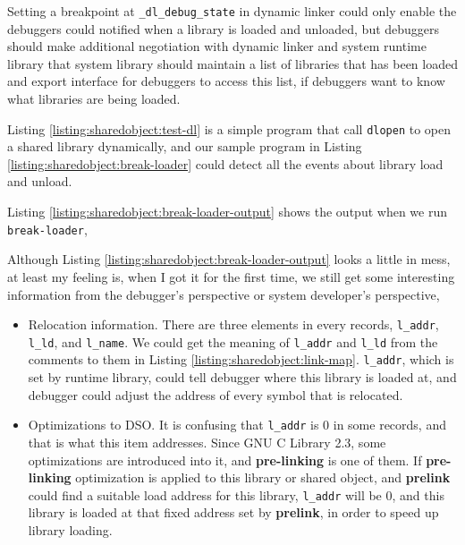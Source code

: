 \documentclass[12pt]{book}
\begin{document}
\begin{CJK}{UTF8}{gbsn}
Setting a breakpoint at \texttt{\_dl\_debug\_state} in dynamic linker could only enable the debuggers could notified when a library is loaded and unloaded,
but debuggers should make additional negotiation with dynamic linker and system runtime library that system library should maintain a list of libraries that
has been loaded and export interface for debuggers to access this list, if debuggers want to know what libraries are being loaded.

Listing \ref{listing:sharedobject:test-dl} is a simple program that call \texttt{dlopen} to open a shared library dynamically, and our sample program
in Listing \ref{listing:sharedobject:break-loader} could detect all the events about library load and unload.





Listing \ref{listing:sharedobject:break-loader-output} shows the output when we run \texttt{break-loader},
\begin{landscape}

\end{landscape}

Although Listing \ref{listing:sharedobject:break-loader-output} looks a little in mess, at least my feeling is, when I got it for the first time, we still get 
some interesting information from the debugger's perspective or system developer's perspective,
\begin{itemize}
\item Relocation information.
There are three elements in every records, \texttt{l\_addr}, \texttt{l\_ld}, and \texttt{l\_name}.  We could get the meaning of \texttt{l\_addr} and \texttt{l\_ld}
from the comments to them in Listing \ref{listing:sharedobject:link-map}.  \texttt{l\_addr}, which is set by runtime library, could tell debugger where this
library is loaded at, and debugger could adjust the address of every symbol that is relocated.
\item Optimizations to DSO.
It is confusing that \texttt{l\_addr} is $0$ in some records, and that is what this item addresses.  Since \textsf{GNU C Library 2.3}, some optimizations are
introduced into it, and \textbf{pre-linking}\cite{Manual:glibc2.3} is one of them.  If \textbf{pre-linking} optimization is applied to this library or shared
object, and \textbf{prelink} could find a suitable load address for this library, \texttt{l\_addr} will be $0$, and this library is loaded at that fixed address
set by \textbf{prelink}, in order to speed up library loading. 
\end{itemize}


\end{CJK}
\end{document}
